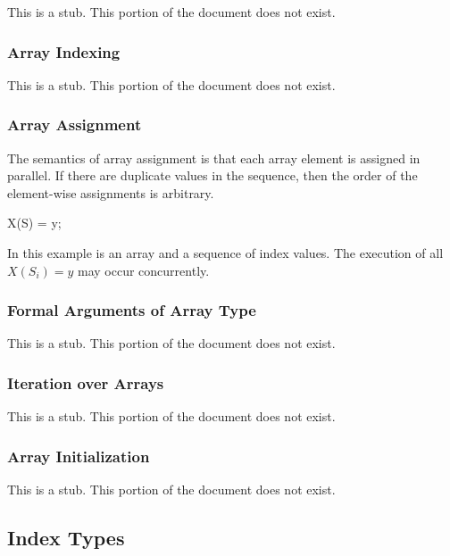 This is a stub.  This portion of the document does not exist.

\subsubsection{Array Indexing}
\label{Array_Indexing}

This is a stub.  This portion of the document does not exist.

\subsubsection{Array Assignment}
\label{Array_Assignment}

The semantics of array assignment is that each array element is
assigned in parallel. If there are duplicate values in the sequence,
then the order of the element-wise assignments is arbitrary.

\begin{example}
\begin{chapel}
X(S) = y;
\end{chapel}
In this example  is an array and  a sequence of index
values. The execution of all $X(S_i)=y$ may occur concurrently. 
\end{example}


\subsubsection{Formal Arguments of Array Type}
\label{Formal_Arguments_of_Array_Type}

This is a stub.  This portion of the document does not exist.

\subsubsection{Iteration over Arrays}
\label{Iteration_over_Arrays}

This is a stub.  This portion of the document does not exist.

\subsubsection{Array Initialization}
\label{Array_Initialization}

This is a stub.  This portion of the document does not exist.

\subsection{Index Types}
\label{Index_Types}

